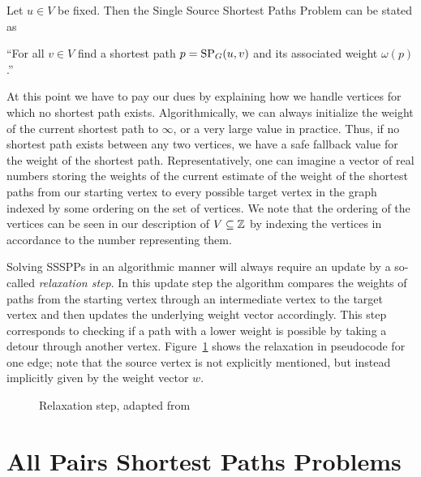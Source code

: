 \begin{definition}\label{def:ssspps}
    Let $u \in V$ be fixed. Then the Single Source Shortest Paths Problem can be stated as
    \begin{displayquote}
        ``For all $v \in V$ find a shortest path $p = \operatorname{SP}_G(u, v)$ and its associated weight $\omega(p)$.''
    \end{displayquote}
\end{definition}

At this point we have to pay our dues by explaining how we handle vertices for which no shortest path exists.
Algorithmically, we can always initialize the weight of the current shortest path to $\infty$, or a very large value in practice.
Thus, if no shortest path exists between any two vertices, we have a safe fallback value for the weight of the shortest path.
Representatively, one can imagine a vector of real numbers storing the weights of the current estimate of the weight of the shortest paths from our starting vertex to every possible target vertex in the graph indexed by some ordering on the set of vertices.
We note that the ordering of the vertices can be seen in our description of $V \subseteq \mathbb{Z}$ by indexing the vertices in accordance to the number representing them.

Solving SSSPPs in an algorithmic manner will always require an update by a so-called \emph{relaxation step}.
In this update step the algorithm compares the weights of paths from the starting vertex through an intermediate vertex to the target vertex and then updates the underlying weight vector accordingly.
This step corresponds to checking if a path with a lower weight is possible by taking a detour through another vertex.
Figure~\ref{alg:relaxation} shows the relaxation in pseudocode for one edge; note that the source vertex is not explicitly mentioned, but instead implicitly given by the weight vector $w$.

\begin{figure}[ht]
    \centering
    \begin{minipage}{.4\textwidth}
        \begin{algorithm}[H]
        \end{algorithm}
    \end{minipage}
    \caption{Relaxation step, adapted from~\cite[Chapter~24]{Cormen2001}}\label{alg:relaxation}
\end{figure}


\section{All Pairs Shortest Paths Problems}



